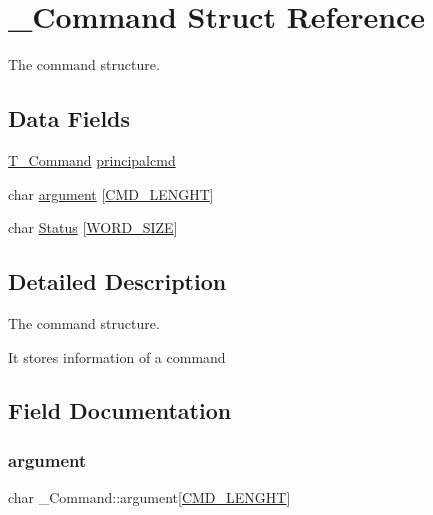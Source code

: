 \hypertarget{struct__Command}{}\section{\+\_\+\+Command Struct Reference}
\label{struct__Command}


The command structure.  


\subsection*{Data Fields}
\begin{DoxyCompactItemize}
\item 
\hyperlink{command_8h_a0473597db8c45c0289b6b8e2f8abbe32}{T\+\_\+\+Command} \hyperlink{struct__Command_a099eea30318b79292723aaf348393eb3}{principalcmd}
\item 
char \hyperlink{struct__Command_add8e455af960bb3e18a212e7b5a7205d}{argument} \mbox{[}\hyperlink{command_8h_a2b1bd24d2eddf8081d8c541e4cc4fd4b}{C\+M\+D\+\_\+\+L\+E\+N\+G\+HT}\mbox{]}
\item 
char \hyperlink{struct__Command_aed496fc04257ae186688187815e0390c}{Status} \mbox{[}\hyperlink{types_8h_a92ed8507d1cd2331ad09275c5c4c1c89}{W\+O\+R\+D\+\_\+\+S\+I\+ZE}\mbox{]}
\end{DoxyCompactItemize}


\subsection{Detailed Description}
The command structure. 

It stores information of a command 

\subsection{Field Documentation}
\mbox{\label{struct__Command_add8e455af960bb3e18a212e7b5a7205d}} 
\subsubsection{\texorpdfstring{argument}{argument}}
{\footnotesize\ttfamily char \+\_\+\+Command\+::argument\mbox{[}\hyperlink{command_8h_a2b1bd24d2eddf8081d8c541e4cc4fd4b}{C\+M\+D\+\_\+\+L\+E\+N\+G\+HT}\mbox{]}}


